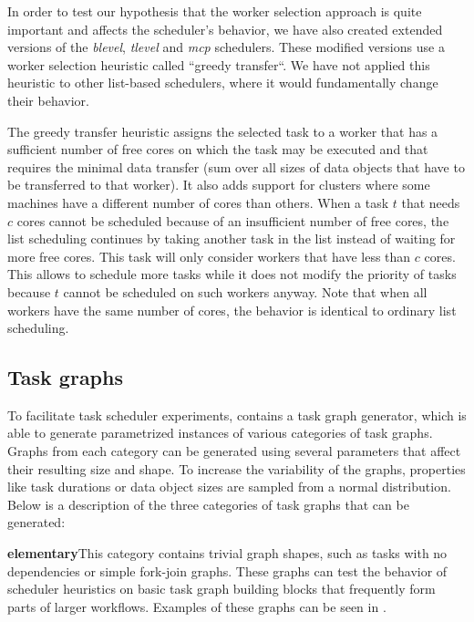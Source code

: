 In order to test our hypothesis that the worker selection approach is quite important and affects
the scheduler's behavior, we have also created extended versions of the \emph{blevel},
\emph{tlevel} and \emph{mcp} schedulers. These modified versions use a
worker selection heuristic called ``greedy transfer``. We have not applied this heuristic to other
list-based schedulers, where it would fundamentally change their behavior.

The greedy transfer heuristic assigns the selected task to a worker that has a sufficient number of
free cores on which the task may be executed and that requires the minimal data transfer (sum over
all sizes of data objects that have to be transferred to that worker). It also adds support for
clusters where some machines have a different number of cores than others. When a task
$t$ that needs $c$ cores cannot be scheduled because of an
insufficient number of free cores, the list scheduling continues by taking another task in the list
instead of waiting for more free cores. This task will only consider workers that have less than
$c$ cores. This allows to schedule more tasks while it does not modify the
priority of tasks because $t$ cannot be scheduled on such workers anyway. Note
that when all workers have the same number of cores, the behavior is identical to ordinary list
scheduling.

\subsection{Task graphs}
To facilitate task scheduler experiments, \estee{} contains a task graph generator,
which is able to generate parametrized instances of various categories of task graphs. Graphs from
each category can be generated using several parameters that affect their resulting size and shape.
To increase the variability of the graphs, properties like task durations or data object sizes are
sampled from a normal distribution. Below is a description of the three categories of task graphs
that can be generated:

\vspace{1mm}\noindent\textbf{elementary}\quad This category contains trivial graph
shapes, such as tasks with no dependencies or simple fork-join graphs. These graphs can test the
behavior of scheduler heuristics on basic task graph building blocks that frequently form parts of
larger workflows. Examples of these graphs can be seen in .

